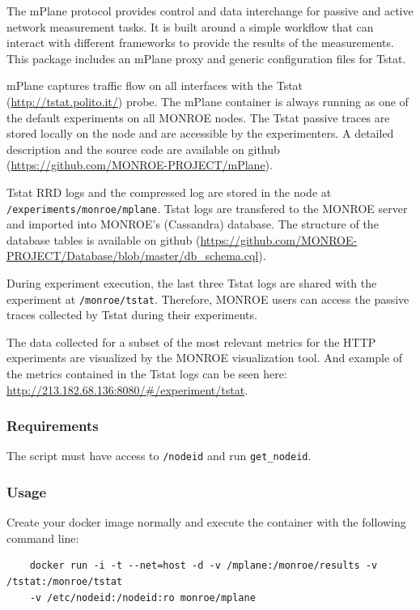 \documentclass[a4paper,10pt]{article}
\newcommand{\VerbatimFont}{\footnotesize}
\newcommand{\monroe}{MONROE}
\newcommand{\identifier}[1]{{\texttt{\small{#1}}}}
\begin{document}
The mPlane protocol provides control and data interchange for passive and active network measurement tasks.
It is built around a simple workflow that can interact with different frameworks to provide the results of the measurements.
This package includes an mPlane proxy and generic configuration files for Tstat.

mPlane captures traffic flow on all interfaces with the Tstat (\url{http://tstat.polito.it/}) probe.
The mPlane container is always running as one of the default experiments on all \monroe{} nodes.
The Tstat passive traces are stored locally on the node and are accessible by the experimenters.
A detailed description and the source code are available on github (\url{https://github.com/MONROE-PROJECT/mPlane}).

Tstat RRD logs and the compressed log are stored in the node at \identifier{/experiments/monroe/mplane}.
Tstat logs are transfered to the \monroe{} server and imported into \monroe{}'s (Cassandra) database.
The structure of the database tables is available on github (\url{https://github.com/MONROE-PROJECT/Database/blob/master/db_schema.cql}).

During experiment execution, the last three Tstat logs are shared with the experiment at \identifier{/monroe/tstat}.
Therefore, \monroe{} users can access the passive traces collected by Tstat during their experiments.

The data collected for a subset of the most relevant metrics for the HTTP experiments are visualized by the \monroe{} visualization tool.
And example of the metrics contained in the Tstat logs can be seen here: \url{http://213.182.68.136:8080/#/experiment/tstat}.

\subsubsection{Requirements}

The script must have access to \identifier{/nodeid} and run \identifier{get\_nodeid}.

\subsubsection{Usage}

Create your docker image normally and execute the container with the following command line:

{\VerbatimFont
	\begin{verbatim}
	docker run -i -t --net=host -d -v /mplane:/monroe/results -v /tstat:/monroe/tstat
	-v /etc/nodeid:/nodeid:ro monroe/mplane
	\end{verbatim}}
\end{document}
